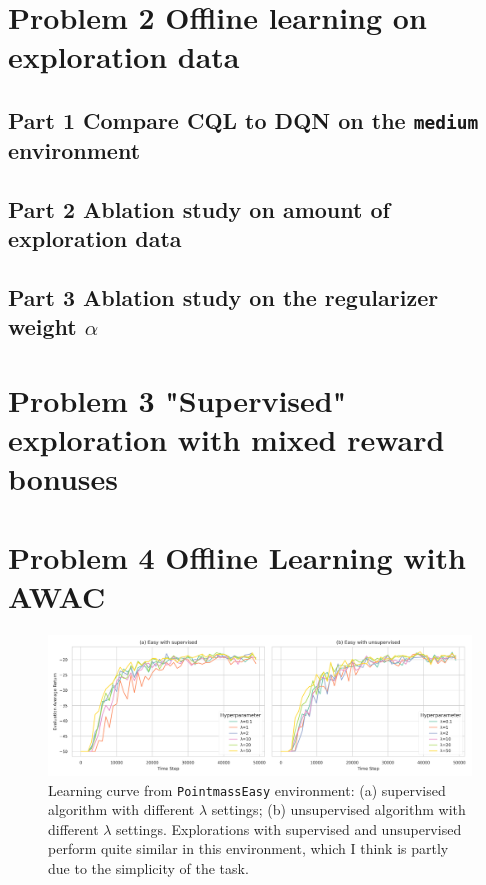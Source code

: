 \documentclass[10pt, letterpaper]{article}
\begin{document}
\pagebreak
\section*{Problem 2 Offline learning on exploration data}
\subsection*{Part 1 Compare CQL to DQN on the \texttt{medium} environment}

\subsection*{Part 2 Ablation study on amount of exploration data}

\subsection*{Part 3 Ablation study on the regularizer weight $\alpha$}

\pagebreak
\section*{Problem 3 "Supervised" exploration with mixed reward bonuses}

\pagebreak
\section*{Problem 4 Offline Learning with AWAC}

\begin{figure}[h!]
    \centering
    \includegraphics[width=\textwidth]{q4_easy.png}
    \caption{Learning curve from \texttt{PointmassEasy} environment: (a) supervised algorithm with different $\lambda$ settings; (b) unsupervised algorithm with different $\lambda$ settings. Explorations with supervised and unsupervised perform quite similar in this environment, which I think is partly due to the simplicity of the task.}
\end{figure}
\end{document}
